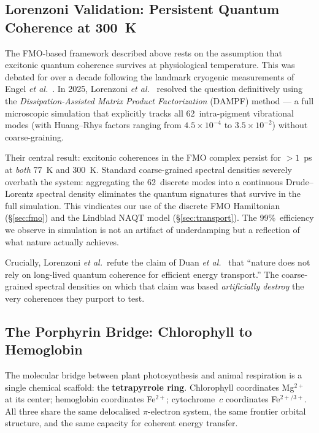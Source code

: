 \documentclass[11pt,twocolumn]{article}
\begin{document}
\subsection{Lorenzoni Validation: Persistent Quantum Coherence at 300~K}

The FMO-based framework described above rests on the
assumption that excitonic quantum coherence survives at physiological
temperature.  This was debated for over a decade following the
landmark cryogenic measurements of Engel \textit{et al.}~\cite{Engel2007}.
In 2025, Lorenzoni \textit{et al.}~\cite{Lorenzoni2025} resolved the
question definitively using the \emph{Dissipation-Assisted Matrix
Product Factorization} (DAMPF) method --- a full microscopic simulation
that explicitly tracks all 62~intra-pigment vibrational modes (with
Huang--Rhys factors ranging from $4.5 \times 10^{-4}$ to $3.5 \times
10^{-2}$) without coarse-graining.

Their central result: excitonic coherences in the FMO complex persist
for $>1$~ps at \emph{both} 77~K and 300~K.  Standard coarse-grained
spectral densities severely overbath the system: aggregating the
62~discrete modes into a continuous Drude--Lorentz spectral density
eliminates the quantum signatures that survive in the full simulation.
This vindicates our use of the discrete FMO Hamiltonian
(\S\ref{sec:fmo}) and the Lindblad NAQT model (\S\ref{sec:transport}).
The 99\%~efficiency we observe in simulation is not an artifact of
underdamping but a reflection of what nature actually achieves.

Crucially, Lorenzoni \textit{et al.}\ refute the claim of
Duan \textit{et al.}~\cite{Duan2017} that ``nature does not rely on
long-lived quantum coherence for efficient energy transport.''  The
coarse-grained spectral densities on which that claim was based
\emph{artificially destroy} the very coherences they purport to test.

\subsection{The Porphyrin Bridge: Chlorophyll to Hemoglobin}

The molecular bridge between plant photosynthesis and animal respiration
is a single chemical scaffold: the \textbf{tetrapyrrole ring}.
Chlorophyll coordinates Mg$^{2+}$ at its center; hemoglobin coordinates
Fe$^{2+}$; cytochrome~$c$ coordinates Fe$^{2+/3+}$.  All three share the
same delocalised $\pi$-electron system, the same frontier orbital
structure, and the same capacity for coherent energy transfer.
\end{document}
